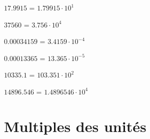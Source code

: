 \documentclass[
  11pt,
  a4paper,
  openany]{book}
\begin{document}
\begin{Answer}
\(17.9915\) = \(1.79915 \cdot 10^{1}\)

\(37560\) = \(3.756 \cdot 10^{4}\)

\(0.00034159\) = \(3.4159 \cdot 10^{-4}\)

\(0.00013365\) = \(13.365 \cdot 10^{-5}\)

\(10335.1\) = \(103.351 \cdot 10 ^{2}\)

\(14896.546\) = \(1.4896546 \cdot 10^{4}\)

\end{Answer}

\hypertarget{multiples-des-unituxe9s}{%
\section{Multiples des unités}\label{multiples-des-unituxe9s}}
\end{document}
